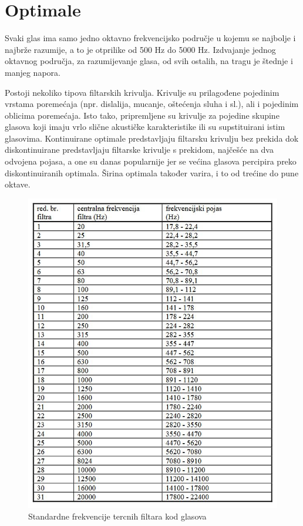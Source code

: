 \documentclass[times, utf8, diplomski]{fer}
\begin{document}
\section{Optimale}
Svaki glas ima samo jedno oktavno frekvencijsko područje u kojemu se najbolje i najbrže razumije, a to je otprilike od 500 Hz do 5000 Hz. Izdvajanje jednog oktavnog područja, za razumijevanje glasa, od svih ostalih, na tragu je štednje i manjeg napora. 

Postoji nekoliko tipova filtarskih krivulja. Krivulje su prilagođene pojedinim vrstama poremećaja (npr. dislalija, mucanje, oštećenja sluha i sl.), ali i pojedinim oblicima poremećaja. Isto tako, pripremljene su krivulje za pojedine skupine glasova koji imaju vrlo slične akustičke karakteristike ili su supstituirani istim  glasovima. Kontinuirane optimale predstavljaju filtarsku krivulju bez prekida dok diskontinuirane predstavljaju filtarske krivulje s prekidom, najčešće na dva odvojena pojasa, a one su danas popularnije jer se većina glasova percipira preko diskontinuiranih optimala. Širina optimala također varira, i to od trećine do pune oktave.

\begin{figure}[ht!]
\centering
  \includegraphics[scale=0.6]{photos/optimale.jpg}
  \caption{Standardne frekvencije tercnih filtara kod glasova}
  \label{fig:optimale}
\end{figure}
\end{document}
